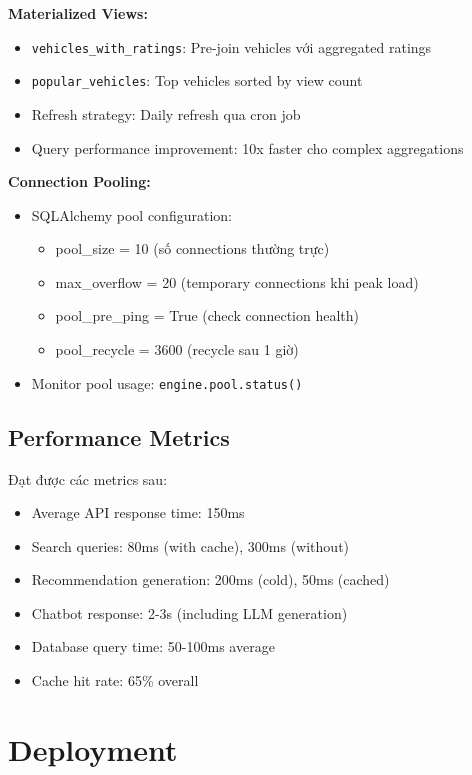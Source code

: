 \begin{itemize}
\textbf{Materialized Views:}
\begin{itemize}
    \item \texttt{vehicles\_with\_ratings}: Pre-join vehicles với aggregated ratings
    \item \texttt{popular\_vehicles}: Top vehicles sorted by view count
    \item Refresh strategy: Daily refresh qua cron job
    \item Query performance improvement: 10x faster cho complex aggregations
\end{itemize}

\textbf{Connection Pooling:}
\begin{itemize}
    \item SQLAlchemy pool configuration:
    \begin{itemize}
        \item pool\_size = 10 (số connections thường trực)
        \item max\_overflow = 20 (temporary connections khi peak load)
        \item pool\_pre\_ping = True (check connection health)
        \item pool\_recycle = 3600 (recycle sau 1 giờ)
    \end{itemize}
    \item Monitor pool usage: \texttt{engine.pool.status()}
\end{itemize}

\subsection{Performance Metrics}

Đạt được các metrics sau:
\begin{itemize}
    \item Average API response time: 150ms
    \item Search queries: 80ms (with cache), 300ms (without)
    \item Recommendation generation: 200ms (cold), 50ms (cached)
    \item Chatbot response: 2-3s (including LLM generation)
    \item Database query time: 50-100ms average
    \item Cache hit rate: 65\% overall
\end{itemize}

\section{Deployment}


\end{itemize}
